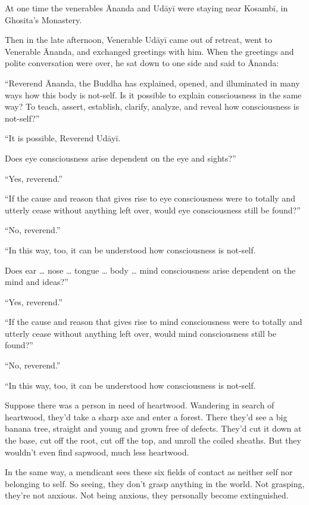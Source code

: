 \documentclass[12pt,openany]{book}%
\begin{document}
At one time the venerables Ānanda and \textsanskrit{Udāyī} were staying near \textsanskrit{Kosambī}, in Ghosita’s Monastery. 

Then in the late afternoon, Venerable \textsanskrit{Udāyī} came out of retreat, went to Venerable Ānanda, and exchanged greetings with him. When the greetings and polite conversation were over, he sat down to one side and said to Ānanda: 

“Reverend Ānanda, the Buddha has explained, opened, and illuminated in many ways how this body is not-self. Is it possible to explain consciousness in the same way? To teach, assert, establish, clarify, analyze, and reveal how consciousness is not-self?” 

“It is possible, Reverend \textsanskrit{Udāyī}. 

Does eye consciousness arise dependent on the eye and sights?” 

“Yes, reverend.” 

“If the cause and reason that gives rise to eye consciousness were to totally and utterly cease without anything left over, would eye consciousness still be found?” 

“No, reverend.” 

“In this way, too, it can be understood how consciousness is not-self. 

Does ear … nose … tongue … body … mind consciousness arise dependent on the mind and ideas?” 

“Yes, reverend.” 

“If the cause and reason that gives rise to mind consciousness were to totally and utterly cease without anything left over, would mind consciousness still be found?” 

“No, reverend.” 

“In this way, too, it can be understood how consciousness is not-self. 

Suppose there was a person in need of heartwood. Wandering in search of heartwood, they’d take a sharp axe and enter a forest. There they’d see a big banana tree, straight and young and grown free of defects. They’d cut it down at the base, cut off the root, cut off the top, and unroll the coiled sheaths. But they wouldn’t even find sapwood, much less heartwood. 

In the same way, a mendicant sees these six fields of contact as neither self nor belonging to self. So seeing, they don’t grasp anything in the world. Not grasping, they’re not anxious. Not being anxious, they personally become extinguished. 
\end{document}
